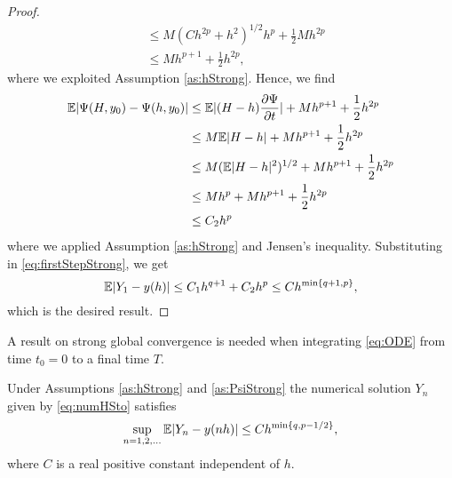 \documentclass{scrartcl}
\begin{document}
\begin{proof}
\begin{equation}
\begin{aligned}
	&\leq M(Ch^{2p} + h^2)^{1/2}h^p + \frac{1}{2}Mh^{2p}\\
	&\leq M h^{p+1} + \frac{1}{2}h^{2p},
	\end{aligned} 
	\end{equation}
	where we exploited Assumption \ref{as:hStrong}. Hence, we find 
	\begin{equation}
	\begin{aligned}
	\mathbb{E}\abs{\Psi(H, y_0) - \Psi(h, y_0)} &\leq \mathbb{E}|(H-h)\pdv{\Psi}{t} (0, y_0)| + M h^{p+1} + \frac{1}{2}h^{2p} \\
	&\leq M\mathbb{E}|H - h| +  M h^{p+1} + \frac{1}{2}h^{2p}\\
	&\leq M(\mathbb{E}|H-h|^2)^{1/2} +  M h^{p+1} + \frac{1}{2}h^{2p} \\
	&\leq Mh^p + M h^{p+1} + \frac{1}{2}h^{2p} \\
	&\leq C_2 h^p
	\end{aligned}
	\end{equation}
	where we applied Assumption \ref{as:hStrong} and Jensen's inequality. Substituting in \eqref{eq:firstStepStrong}, we get
	\begin{equation}
	\mathbb{E}\abs{Y_1 - y(h)} \leq C_1h^{q+1} + C_2 h^{p} \leq Ch^{\min\{q+1, p\}},
	\end{equation}
	which is the desired result.
\end{proof}
\noindent A result on strong global convergence is needed when integrating \eqref{eq:ODE} from time $t_0 = 0$ to a final time $T$.
\begin{theorem} Under Assumptions \ref{as:hStrong} and \ref{as:PsiStrong} the numerical solution $Y_n$ given by \eqref{eq:numHSto} satisfies 
	\begin{equation}\label{eq:StrongGlobalClaim}
	\sup_{n=1,2, \ldots} \mathbb{E}\abs{Y_n - y(nh)} \leq C h^{\min\{q, p-1/2\}},
	\end{equation}
	where $C$ is a real positive constant independent of $h$.
\end{theorem}
\end{document}
